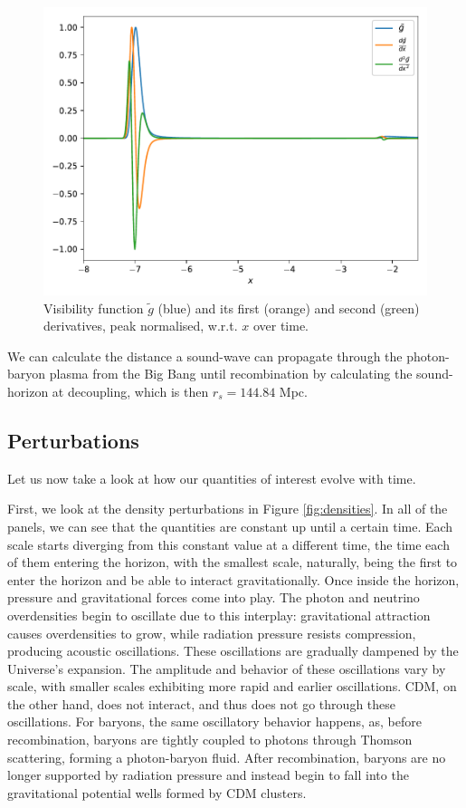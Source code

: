 \documentclass{aa}
\begin{document}
\begin{figure}[ht]
    \centering
    \includegraphics[width=\hsize]{report/figures/gtilde.pdf}
    \caption{Visibility function $\tilde g$ (blue) and its first (orange) and second (green) derivatives, peak normalised, w.r.t. $x$ over time.}
    \label{fig:gtilde}
\end{figure}

We can calculate the distance a sound-wave can propagate through the photon-baryon plasma from the Big Bang until recombination by calculating the sound-horizon at decoupling, which is then $r_s = 144.84$ Mpc.

\subsection{Perturbations}

Let us now take a look at how our quantities of interest evolve with time.

First, we look at the density perturbations in Figure \ref{fig:densities}. In all of the panels, we can see that the quantities are constant up until a certain time. Each scale starts diverging from this constant value at a different time, the time each of them entering the horizon, with the smallest scale, naturally, being the first to enter the horizon and be able to interact gravitationally. Once inside the horizon, pressure and gravitational forces come into play. The photon and neutrino overdensities begin to oscillate due to this interplay: gravitational attraction causes overdensities to grow, while radiation pressure resists compression, producing acoustic oscillations. These oscillations are gradually dampened by the Universe’s expansion. The amplitude and behavior of these oscillations vary by scale, with smaller scales exhibiting more rapid and earlier oscillations. CDM, on the other hand, does not interact, and thus does not go through these oscillations. For baryons, the same oscillatory behavior happens, as, before recombination, baryons are tightly coupled to photons through Thomson scattering, forming a photon-baryon fluid. After recombination, baryons are no longer supported by radiation pressure and instead begin to fall into the gravitational potential wells formed by CDM clusters.
\end{document}
